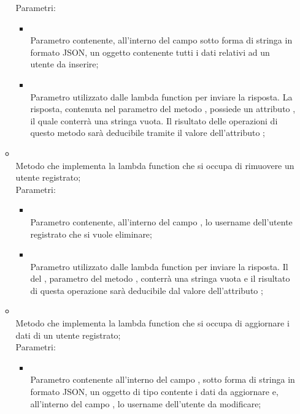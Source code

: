 \begin{itemize}
\begin{itemize}
		Parametri:
		\begin{itemize}
			\item {} \\
			Parametro contenente, all'interno del campo  sotto forma di stringa in formato JSON, un oggetto  contenente tutti i dati relativi ad un utente da inserire;
			\item {} \\
			Parametro utilizzato dalle lambda function per inviare la risposta. La risposta, contenuta nel  parametro del metodo , possiede un attributo , il quale conterrà una stringa vuota. Il risultato delle operazioni di questo metodo sarà deducibile tramite il valore dell'attributo ;
		\end{itemize}
		\item[]  \\
		Metodo che implementa la lambda function che si occupa di rimuovere un utente registrato;\\
		Parametri:
		\begin{itemize}
			\item {} \\
			Parametro contenente, all'interno del campo , lo username dell'utente registrato che si vuole eliminare;
			\item {} \\
			Parametro utilizzato dalle lambda function per inviare la risposta. Il  del , parametro del metodo , conterrà una stringa vuota e il risultato di questa operazione sarà deducibile dal valore dell'attributo ;
		\end{itemize}
		\item[]  \\
		Metodo che implementa la lambda function che si occupa di aggiornare i dati di un utente registrato;\\
		Parametri:
		\begin{itemize}
			\item {} \\
			Parametro contenente all'interno del campo , sotto forma di stringa in formato JSON, un oggetto di tipo  contente i dati da aggiornare e, all'interno del campo , lo username dell'utente da modificare;

\end{itemize}
\end{itemize}
\end{itemize}
